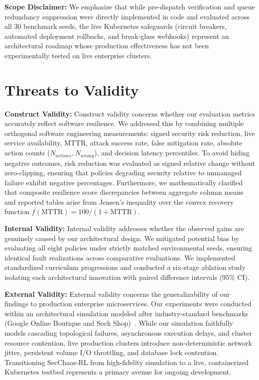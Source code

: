 \documentclass[ASNA,twocolumn]{USG}
\begin{document}
\textbf{Scope Disclaimer:} We emphasize that while pre-dispatch verification and queue redundancy suppression were directly implemented in code and evaluated across all 30 benchmark seeds, the live Kubernetes safeguards (circuit breakers, automated deployment rollbacks, and break-glass webhooks) represent an architectural roadmap whose production effectiveness has not been experimentally tested on live enterprise clusters.

\section{Threats to Validity}
\label{sec:validity}

\textbf{Construct Validity:} Construct validity concerns whether our evaluation metrics accurately reflect software resilience. We addressed this by combining multiple orthogonal software engineering measurements: signed security risk reduction, live service availability, MTTR, attack success rate, false mitigation rate, absolute action counts ($N_{actions}, N_{wrong}$), and decision latency percentiles. To avoid hiding negative outcomes, risk reduction was evaluated as signed relative change without zero-clipping, ensuring that policies degrading security relative to unmanaged failure exhibit negative percentages. Furthermore, we mathematically clarified that composite resilience score discrepancies between aggregate column means and reported tables arise from Jensen's inequality over the convex recovery function $f(\text{MTTR}) = 100 / (1 + \text{MTTR})$.

\textbf{Internal Validity:} Internal validity addresses whether the observed gains are genuinely caused by our architectural design. We mitigated potential bias by evaluating all eight policies under strictly matched environmental seeds, ensuring identical fault realizations across comparative evaluations. We implemented standardized curriculum progressions and conducted a six-stage ablation study isolating each architectural innovation with paired difference intervals ($95\%$ CI).

\textbf{External Validity:} External validity concerns the generalizability of our findings to production enterprise microservices. Our experiments were conducted within an architectural simulation modeled after industry-standard benchmarks (Google Online Boutique and Sock Shop)~\cite{aderaldo2025declarative, soldani2023microservice}. While our simulation faithfully models cascading topological failures, asynchronous execution delays, and cluster resource contention, live production clusters introduce non-deterministic network jitter, persistent volume I/O throttling, and database lock contention. Transitioning SecChaos-RL from high-fidelity simulation to a live, containerized Kubernetes testbed represents a primary avenue for ongoing development.
\end{document}
